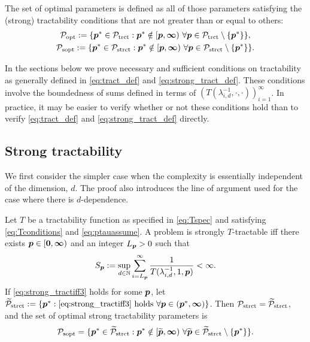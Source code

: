 \documentclass[11pt,a4paper]{article}
\begin{document}
\begin{definition}
    The  set of optimal parameters is defined as all of those parameters satisfying the (strong) tractability conditions that are not greater than or equal to others:
\begin{gather}
	\label{eq:Poptdef}
	\mathcal{P}_{\textup{opt}} : = \{\boldsymbol{p}^* \in \mathcal{P}_{\textup{trct}} :  \boldsymbol{p}^* \notin [\boldsymbol{p},\boldsymbol{\infty}) \ \forall \boldsymbol{p} \in  \mathcal{P}_{\textup{trct}} \setminus \{\boldsymbol{p}^*\} \}, \\
	\label{eq:Psoptdef}
	\mathcal{P}_{\textup{sopt}} : = \{\boldsymbol{p}^* \in \mathcal{P}_{\textup{strct}} :  \boldsymbol{p}^* \notin [\boldsymbol{p},\boldsymbol{\infty}) \ \forall \boldsymbol{p} \in  \mathcal{P}_{\textup{strct}} \setminus \{\boldsymbol{p}^*\} \}.
\end{gather}
\end{definition}


In the sections below we prove necessary and sufficient conditions on tractability as generally defined in \eqref{eq:tract_def} and \eqref{eq:strong_tract_def}.  These conditions involve the boundedness of sums defined in terms of $(T(\lambda_{i,d}^{-1},\cdot, \cdot))_{i=1}^\infty$.  In practice, it may be easier to verify whether or not these conditions hold than to verify \eqref{eq:tract_def} and \eqref{eq:strong_tract_def} directly.




\subsection{Strong tractability}

We first consider the simpler case when the complexity is essentially independent of the dimension, $d$.  The proof also introduces the line of argument used for the case where there is $d$-dependence.

\begin{theorem}\label{thm_main_strong_tract2}
Let $T$ be a tractability function as specified in \eqref{eq:Tspec} and satisfying \eqref{eq:Tconditions} and \eqref{eq:ptauassume}.  A problem is strongly $T$-tractable iff there exists $\boldsymbol{p} \in [\boldsymbol{0}, \boldsymbol{\infty})$ and an integer $L_{\boldsymbol{p}} > 0$ such that
\begin{equation} \label{eq:strong_tractiff3}
     S_{\boldsymbol{p}}:=\sup_{d \in \mathbb{N}} \sum_{i = L_{\boldsymbol{p}}}^\infty \frac{1}{T(\lambda_{i,d}^{-1},1,\boldsymbol{p})} < \infty.
\end{equation}
If \eqref{eq:strong_tractiff3} holds for some $\boldsymbol{p}$, let  $\widetilde{\mathcal{P}}_{\textup{strct}} : = \{\boldsymbol{p}^* : \eqref{eq:strong_tractiff3} \text{ holds }\forall \boldsymbol{p} \in (\boldsymbol{p}^*,\boldsymbol{\infty})\}$.  Then $\mathcal{P}_{\textup{strct}} = \widetilde{\mathcal{P}}_{\textup{strct}}$, and the set of optimal strong tractability parameters is
\[
	\mathcal{P}_{\textup{sopt}} =
	\{\boldsymbol{p}^* \in \widetilde{\mathcal{P}}_{\textup{strct}} :  \boldsymbol{p}^* \notin [\widetilde{\boldsymbol{p}},\boldsymbol{\infty}) \ \forall \widetilde{\boldsymbol{p}}\in  \widetilde{\mathcal{P}}_{\textup{strct}} \setminus \{\boldsymbol{p}^*\} \}.
\]
\end{theorem}
\end{document}

